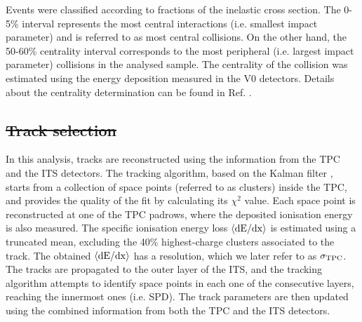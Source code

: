 \documentclass[ALICE,manyauthors]{cernphprep}
\providecommand{\DIFaddtex}[1]{{\protect\color{blue}\uwave{#1}}} %
\providecommand{\DIFdeltex}[1]{{\protect\color{red}\sout{#1}}}                      %
\providecommand{\DIFaddbegin}{} %
\providecommand{\DIFaddend}{} %
\providecommand{\DIFdelbegin}{} %
\providecommand{\DIFdelend}{} %
\providecommand{\DIFadd}[1]{\texorpdfstring{\DIFaddtex{#1}}{#1}} %
\providecommand{\DIFdel}[1]{\texorpdfstring{\DIFdeltex{#1}}{}} %
\begin{document}
Events were classified according to fractions of the inelastic cross section. The 0-5\% interval represents the most central interactions (i.e. smallest impact parameter) and is referred to as most central collisions. On the other hand, the 50-60\% centrality interval corresponds to the most peripheral (i.e. largest impact parameter) collisions in the analysed sample. The centrality of the collision was estimated using the energy deposition measured in the V0 detectors. Details about the centrality determination can be found in Ref. \cite{Abelev:2013qoq}.

\DIFaddbegin 

\DIFaddend \subsection{\DIFdelbegin \DIFdel{Track selection}\DIFdelend \DIFaddbegin \DIFadd{Selection of primary }\pion\DIFadd{, }\kaon\DIFadd{~and }\proton\DIFaddend }
\label{SubSec:Track}
In this analysis, tracks are reconstructed using the information from the TPC and the ITS detectors. The tracking algorithm, based on the Kalman filter \cite{Billoir:1983mz,Billoir:1985nq}, starts from a collection of space points (referred to as clusters) inside the TPC, and provides the quality of the fit by calculating its $\chi^{2}$ value. Each space point is reconstructed at one of the TPC padrows, where the deposited ionisation energy is also measured. The specific ionisation energy loss $\langle{\rm{dE}/dx}\rangle$ is estimated using a truncated mean, excluding the 40\% highest-charge clusters associated to the track. The obtained $\langle{\rm{dE}/dx}\rangle$ has a resolution, which we later refer to as $\sigma_{\rm{TPC}}$. The tracks are propagated to the outer layer of the ITS, and the tracking algorithm attempts to identify space points in each one of the consecutive layers, reaching the innermost ones (i.e. SPD). The track parameters are then updated using the combined information from both the TPC and the ITS detectors. 
\end{document}
